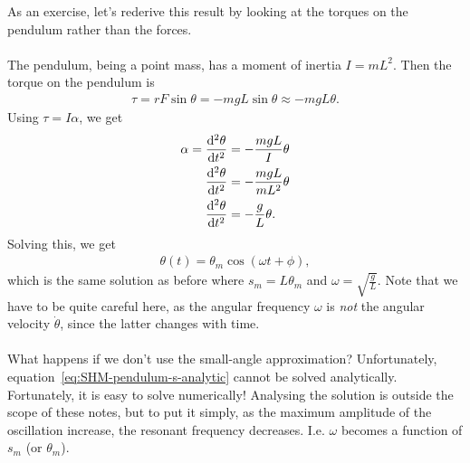 \documentclass[../classical_mechanics.tex]{subfiles}
\begin{document}
        \begin{example}
            As an exercise, let's rederive this result by looking at the torques on the pendulum rather than the forces.

            \paragraph{}
            The pendulum, being a point mass, has a moment of inertia $I=mL^2$.
            Then the torque on the pendulum is
            \begin{eqnarray}
                \tau=rF\sin\theta=-mgL\sin\theta\approx -mgL\theta.
            \end{eqnarray}
            Using $\tau=I\alpha$, we get
            \begin{align}
                \alpha=\dv[2]{\theta}{t}&=-\frac{mgL}{I}\theta\label{eq:SHM-pendulum-theta-moi}\\
                \dv[2]{\theta}{t}&=-\frac{mgL}{mL^2}\theta\\
                \dv[2]{\theta}{t}&=-\frac{g}{L}\theta.
            \end{align}
            Solving this, we get
            \begin{eqnarray}
                \theta(t)=\theta_m\cos(\omega t+\phi),
            \end{eqnarray}
            which is the same solution as before where $s_m=L\theta_m$ and $\omega=\sqrt{\frac{g}{L}}$.
            Note that we have to be quite careful here, as the angular frequency $\omega$ is \textit{not} the angular velocity $\dot{\theta}$, since the latter changes with time.
        \end{example}

        \paragraph{}
        What happens if we don't use the small-angle approximation?
        Unfortunately, equation~\ref{eq:SHM-pendulum-s-analytic} cannot be solved analytically.
        Fortunately, it is easy to solve numerically!
        Analysing the solution is outside the scope of these notes, but to put it simply, as the maximum amplitude of the oscillation increase, the resonant frequency decreases.
        I.e. $\omega$ becomes a function of $s_m$ (or $\theta_m$).
\end{document}
